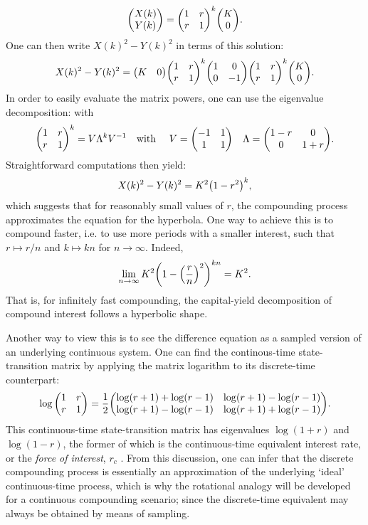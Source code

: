 $$ \mqty(X(k)\\Y(k)) = \mqty(1& r \\ r & 1)^k\mqty(\ininv\\0). $$
One can then write $X(k)^2 - Y(k)^2$ in terms of this solution:
$$ X(k)^2 - Y(k)^2 = \mqty(K & 0)\mqty(1& r \\ r & 1)^k\mqty(1 & 0\\0 & -1)\mqty(1& r \\ r & 1)^k\mqty(K\\0).$$
In order to easily evaluate the matrix powers, one can use the eigenvalue decomposition:
with
$$ \mqty(1 & r \\  r & 1)^k = V\Lambda^k V^{-1} \qq{with } V = \mqty(-1 & 1 \\ 1 & 1) \quad \Lambda = \mqty(1 - r & 0\\0 & 1 + r). $$
Straightforward computations then yield:
$$ X(k)^2 - Y(k)^2 = K^2\qty(1 - r^2)^k, $$
which suggests that for reasonably small values of $r$, the compounding process approximates the equation for the hyperbola. One way to achieve this is to compound faster, i.e. to use more periods with a smaller interest, such that $r \mapsto r/n$ and $k \mapsto kn$ for $n \to \infty$. Indeed, 
$$ \lim_{n\to\infty} K^2\qty(1 - \qty(\frac{r}{n})^2)^{kn} = K^2. $$
That is, for infinitely fast compounding, the capital-yield decomposition of compound interest follows a hyperbolic shape.

Another way to view this is to see the difference equation as a sampled version of an underlying continuous system. One can find the continous-time state-transition matrix by applying the matrix logarithm to its discrete-time counterpart:
    $$ \log \mqty(1 & r \\ r & 1) = 
        \frac{1}{2}\mqty(\log(r + 1) + \log(r - 1) & \log(r + 1) - \log(r - 1)\\
                         \log(r + 1) - \log(r - 1) & \log(r + 1) + \log(r - 1)). $$
This continuous-time state-transition matrix has eigenvalues $\log(1 + r)$ and $\log(1 - r)$, the former of which is the continuous-time equivalent interest rate, or the \emph{force of interest}, $r_c$ \cite{Kellison1991}. From this discussion, one can infer that the discrete compounding process is essentially an approximation of the underlying `ideal' continuous-time process, which is why the rotational analogy will be developed for a continuous compounding scenario; since the discrete-time equivalent may always be obtained by means of sampling.

